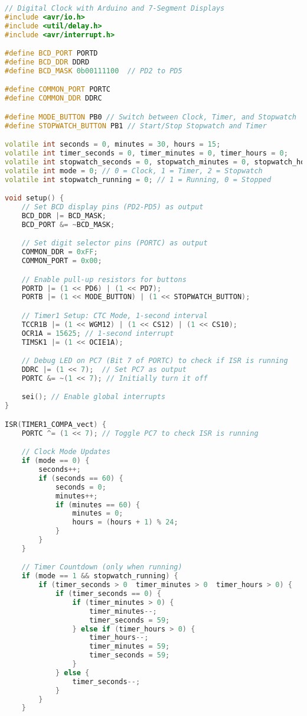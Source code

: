 \documentclass[a4paper,12pt]{article}
\begin{document}
\begin{lstlisting}[language=C++, caption=Arduino Code for Digital Clock]
// Digital Clock with Arduino and 7-Segment Displays
#include <avr/io.h>
#include <util/delay.h>
#include <avr/interrupt.h>

#define BCD_PORT PORTD
#define BCD_DDR DDRD
#define BCD_MASK 0b00111100  // PD2 to PD5

#define COMMON_PORT PORTC
#define COMMON_DDR DDRC

#define MODE_BUTTON PB0 // Switch between Clock, Timer, and Stopwatch
#define STOPWATCH_BUTTON PB1 // Start/Stop Stopwatch and Timer

volatile int seconds = 0, minutes = 30, hours = 15;
volatile int timer_seconds = 0, timer_minutes = 0, timer_hours = 0;
volatile int stopwatch_seconds = 0, stopwatch_minutes = 0, stopwatch_hours = 0;
volatile int mode = 0; // 0 = Clock, 1 = Timer, 2 = Stopwatch
volatile int stopwatch_running = 0; // 1 = Running, 0 = Stopped

void setup() {
    // Set BCD display pins (PD2-PD5) as output
    BCD_DDR |= BCD_MASK;
    BCD_PORT &= ~BCD_MASK;

    // Set digit selector pins (PORTC) as output
    COMMON_DDR = 0xFF;
    COMMON_PORT = 0x00;

    // Enable pull-up resistors for buttons
    PORTD |= (1 << PD6) | (1 << PD7);
    PORTB |= (1 << MODE_BUTTON) | (1 << STOPWATCH_BUTTON);

    // Timer1 Setup: CTC Mode, 1-second interval
    TCCR1B |= (1 << WGM12) | (1 << CS12) | (1 << CS10);
    OCR1A = 15625; // 1-second interrupt
    TIMSK1 |= (1 << OCIE1A);

    // Debug LED on PC7 (Bit 7 of PORTC) to check if ISR is running
    DDRC |= (1 << 7);  // Set PC7 as output
    PORTC &= ~(1 << 7); // Initially turn it off

    sei(); // Enable global interrupts
}

ISR(TIMER1_COMPA_vect) {
    PORTC ^= (1 << 7); // Toggle PC7 to check ISR is running

    // Clock Mode Updates
    if (mode == 0) {
        seconds++;
        if (seconds == 60) {
            seconds = 0;
            minutes++;
            if (minutes == 60) {
                minutes = 0;
                hours = (hours + 1) % 24;
            }
        }
    }

    // Timer Countdown (only when running)
    if (mode == 1 && stopwatch_running) {  
        if (timer_seconds > 0  timer_minutes > 0  timer_hours > 0) {
            if (timer_seconds == 0) {
                if (timer_minutes > 0) {
                    timer_minutes--;
                    timer_seconds = 59;
                } else if (timer_hours > 0) {
                    timer_hours--;
                    timer_minutes = 59;
                    timer_seconds = 59;
                }
            } else {
                timer_seconds--;
            }
        }
    }


\end{lstlisting}
\end{document}
